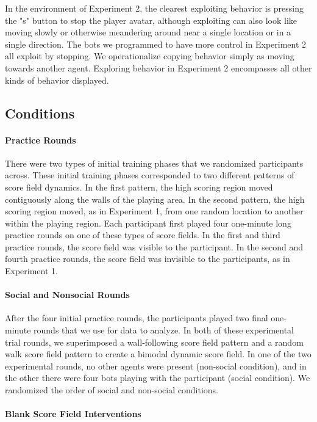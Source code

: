 \documentclass[12pt,letterpaper]{article}
\begin{document}
In the environment of Experiment 2, the clearest exploiting behavior is pressing the "s" button to stop the player avatar, although exploiting can also look like moving slowly or otherwise meandering around near a single location or in a single direction.  The bots we programmed to have more control in Experiment 2 all exploit by stopping.  We operationalize copying behavior simply as moving towards another agent.  Exploring behavior in Experiment 2 encompasses all other kinds of behavior displayed.

\subsection{Conditions}

\paragraph{Practice Rounds}

There were two types of initial training phases that we randomized participants across. These initial training phases corresponded to two different patterns of score field dynamics. In the first pattern, the high scoring region moved contiguously along the walls of the playing area. In the second pattern, the high scoring region moved, as in Experiment 1, from one random location to another within the playing region.  Each participant first played four one-minute long practice rounds on one of these types of score fields. In the first and third practice rounds, the score field was visible to the participant.   In the second and fourth practice rounds, the score field was invisible to the participants, as in Experiment 1. 


\paragraph{Social and Nonsocial Rounds}

After the four initial practice rounds, the participants played two final one-minute rounds that we use for data to analyze. In both of these experimental trial rounds, we superimposed a wall-following score field pattern and a random walk score field pattern to create a bimodal dynamic score field. In one of the two experimental rounds, no other agents were present (non-social condition), and in the other there were four bots playing with the participant (social condition). We randomized the order of social and non-social conditions. 

\paragraph{Blank Score Field Interventions}
\end{document}
